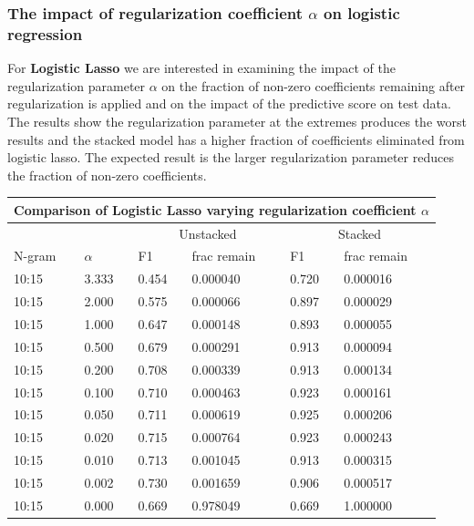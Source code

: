 \documentclass[11pt]{article}
\begin{document}
{\subsubsection{The impact of regularization coefficient $\alpha$ on logistic regression}
\noindent 
For \textbf{Logistic Lasso} we are interested in examining the impact of the regularization parameter $\alpha$ on
the fraction of  non-zero coefficients remaining after regularization is applied and on the impact of the predictive
score on test data. The results show the regularization parameter at the extremes produces the worst results
and the stacked model has a higher fraction of coefficients eliminated from logistic lasso. The expected result
is the larger regularization parameter reduces the fraction of non-zero coefficients.\\

\noindent \begin{tabular}{ |p{2cm}||p{2cm}|p{2cm}|p{2cm}|p{2cm}|p{2cm}|  }
 \hline
 \multicolumn{6}{|c|}{Comparison of Logistic Lasso varying regularization coefficient $\alpha$} \\
 \hline
 \multicolumn{1}{|c|}{} &
 \multicolumn{1}{|c|}{} &
 \multicolumn{2}{|c|}{Unstacked} &
 \multicolumn{2}{|c|}{Stacked}\\
 \hline
 N-gram & $\alpha$ & F1 & frac remain & F1 & frac remain\\
 \hline

10:15 &  3.333 & 0.454 & 0.000040 & 0.720 & 0.000016 \\
10:15 &  2.000 & 0.575 & 0.000066 & 0.897 & 0.000029 \\
10:15 &  1.000 & 0.647 & 0.000148 & 0.893 & 0.000055 \\
10:15 &  0.500 & 0.679 & 0.000291 & 0.913 & 0.000094 \\
10:15 &  0.200 & 0.708 & 0.000339 & 0.913 & 0.000134 \\
10:15 &  0.100 & 0.710 & 0.000463 & 0.923 & 0.000161 \\
10:15 &  0.050 & 0.711 & 0.000619 & 0.925 & 0.000206 \\
10:15 &  0.020 & 0.715 & 0.000764 & 0.923 & 0.000243 \\
10:15 &  0.010 & 0.713 & 0.001045 & 0.913 & 0.000315 \\
10:15 &  0.002 & 0.730 & 0.001659 & 0.906 & 0.000517 \\
10:15 &  0.000 & 0.669 & 0.978049 & 0.669 & 1.000000 \\
 \hline
\end{tabular}

}
\end{document}

